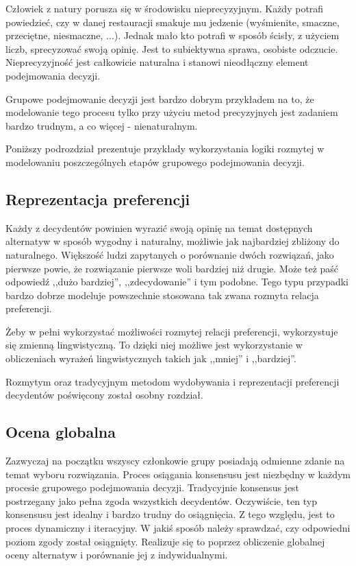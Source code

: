 Człowiek z natury porusza się w środowisku nieprecyzyjnym. Każdy potrafi 
powiedzieć, czy w danej restauracji smakuje mu jedzenie (wyśmienite, smaczne,
przeciętne, niesmaczne, $\dotsc$). Jednak mało kto potrafi w sposób ścisły, z użyciem liczb,
sprecyzować swoją opinię. Jest to subiektywna sprawa, osobiste odczucie. 
Nieprecyzyjność jest całkowicie naturalna i stanowi nieodłączny element 
podejmowania decyzji.

Grupowe podejmowanie decyzji jest bardzo dobrym przykładem na to, że 
modelowanie tego procesu tylko przy użyciu metod precyzyjnych jest zadaniem 
bardzo trudnym, a co więcej - nienaturalnym.

Poniższy podrozdział prezentuje przykłady wykorzystania logiki rozmytej w 
modelowaniu poszczególnych etapów grupowego podejmowania decyzji.

\subsection{Reprezentacja preferencji}
Każdy z decydentów powinien wyrazić swoją opinię na temat dostępnych alternatyw 
w sposób wygodny i naturalny, możliwie jak najbardziej zbliżony do naturalnego. 
Większość ludzi zapytanych o porównanie dwóch rozwiązań, jako pierwsze powie, 
że rozwiązanie pierwsze woli bardziej niż drugie. Może też paść odpowiedź ,,dużo
bardziej'', ,,zdecydowanie'' i tym podobne. Tego typu przypadki bardzo dobrze
modeluje powszechnie stosowana tak zwana rozmyta relacja preferencji.

Żeby w pełni wykorzystać możliwości rozmytej relacji preferencji, wykorzystuje 
się zmienną lingwistyczną. To dzięki niej możliwe jest wykorzystanie w 
obliczeniach wyrażeń lingwistycznych takich jak ,,mniej'' i ,,bardziej''.

Rozmytym oraz tradycyjnym metodom wydobywania i reprezentacji preferencji 
decydentów poświęcony został osobny rozdział.

\subsection{Ocena globalna}
Zazwyczaj na początku wszyscy członkowie grupy posiadają odmienne zdanie na 
temat wyboru rozwiązania. Proces osiągania konsensusu jest niezbędny w każdym 
procesie grupowego podejmowania decyzji. Tradycyjnie konsensus jest postrzegany 
jako pełna zgoda wszystkich decydentów. Oczywiście, ten typ konsensusu jest 
idealny i bardzo trudny do osiągnięcia. Z tego względu, jest to proces 
dynamiczny i iteracyjny. W jakiś sposób należy sprawdzać, czy odpowiedni poziom 
zgody został osiągnięty. Realizuje się to poprzez obliczenie globalnej oceny 
alternatyw i porównanie jej z indywidualnymi.


